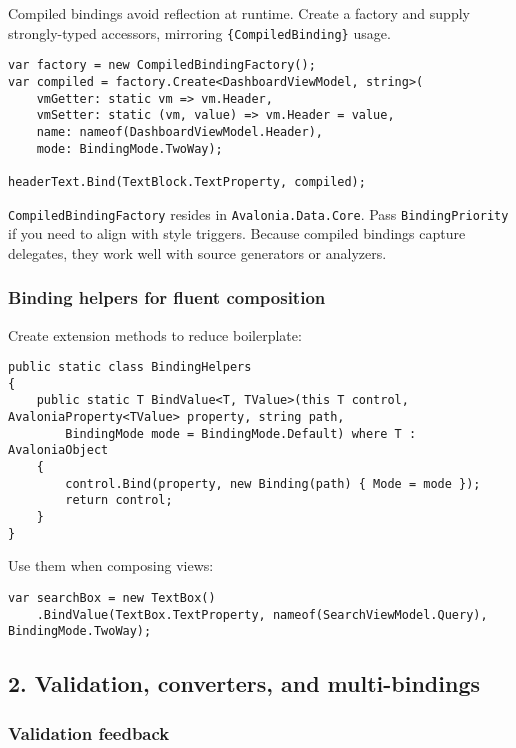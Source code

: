 Compiled bindings avoid reflection at runtime. Create a factory and
supply strongly-typed accessors, mirroring
\passthrough{\lstinline!\{CompiledBinding\}!} usage.

\begin{lstlisting}
var factory = new CompiledBindingFactory();
var compiled = factory.Create<DashboardViewModel, string>(
    vmGetter: static vm => vm.Header,
    vmSetter: static (vm, value) => vm.Header = value,
    name: nameof(DashboardViewModel.Header),
    mode: BindingMode.TwoWay);

headerText.Bind(TextBlock.TextProperty, compiled);
\end{lstlisting}

\passthrough{\lstinline!CompiledBindingFactory!} resides in
\passthrough{\lstinline!Avalonia.Data.Core!}. Pass
\passthrough{\lstinline!BindingPriority!} if you need to align with
style triggers. Because compiled bindings capture delegates, they work
well with source generators or analyzers.

\subsubsection{Binding helpers for fluent
composition}\label{binding-helpers-for-fluent-composition}

Create extension methods to reduce boilerplate:

\begin{lstlisting}
public static class BindingHelpers
{
    public static T BindValue<T, TValue>(this T control, AvaloniaProperty<TValue> property, string path,
        BindingMode mode = BindingMode.Default) where T : AvaloniaObject
    {
        control.Bind(property, new Binding(path) { Mode = mode });
        return control;
    }
}
\end{lstlisting}

Use them when composing views:

\begin{lstlisting}
var searchBox = new TextBox()
    .BindValue(TextBox.TextProperty, nameof(SearchViewModel.Query), BindingMode.TwoWay);
\end{lstlisting}

\subsection{2. Validation, converters, and
multi-bindings}\label{validation-converters-and-multi-bindings}

\subsubsection{Validation feedback}\label{validation-feedback}

